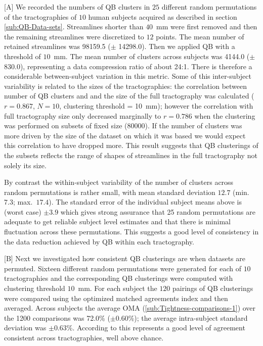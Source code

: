 \documentclass{bioinfo}
\begin{document}
[A] We recorded the numbers of QB clusters in $25$ different random
permutations of the tractographies of $10$ human subjects acquired as
described in section \ref{sub:QB-Data-sets}. Streamlines shorter than
$40$~mm were first removed and then the remaining streamlines were
discretized to $12$ points. The mean number of retained streamlines was
\num{98159.5} ($\pm$ \num{14298.0}). Then we applied QB with a threshold
of $10$~mm. The mean number of clusters across subjects was \num{4144.0}
($\pm$ \num{830.0}), representing a data compression ratio of about
24:1. There is therefore a considerable between-subject variation in
this metric. Some of this inter-subject variability is related to the
sizes of the tractographies: the correlation between number of QB
clusters and and the size of the full tractography was calculated
($r=0.867$, $N=10$, clustering threshold = 10~mm); however the
correlation with full tractography size only decreased marginally to
$r=0.786$ when the clustering was performed on subsets of fixed size
(\num{80000}).  If the number of clusters was more driven by the size of
the dataset on which it was based we would expect this correlation to
have dropped more.  This result suggests that QB clusterings of the
subsets reflects the range of shapes of streamlines in the full
tractography not solely its size.

By contrast the within-subject variability of the number of clusters
across random permutations is rather small, with mean standard deviation
$12.7$ (min.~$7.3$; max.~$17.4$). The standard error of the individual
subject means above is (worst case) $\pm 3.9$ which gives strong
assurance that 25 random permutations are adequate to get reliable
subject level estimates and that there is minimal fluctuation across these
permutations. This suggests a good level of consistency in the data
reduction achieved by QB within each tractography.

[B] Next we investigated how consistent QB clusterings are when datasets
are permuted. Sixteen different random permutations were generated for
each of $10$ tractographies and the corresponding QB clusterings were
computed with clustering threshold $10$~mm. For each subject the $120$
pairings of QB clusterings were compared using the optimized matched
agreements index and then averaged. Across subjects the average OMA
(\ref{sub:Tightness-comparisons-1}) over the \num{1200} comparisons was
72.0\% ($\pm 0.60$\%); the average intra-subject standard deviation was
$\pm 0.63$\%. According to \citet{altman1995} this represents a good
level of agreement consistent across tractographies, well above chance.
\end{document}
